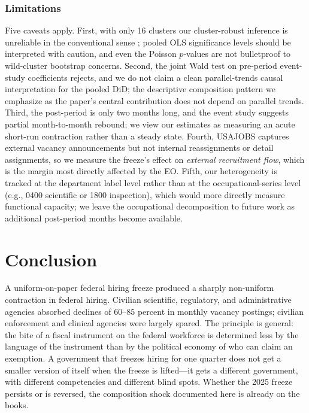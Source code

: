 \documentclass[12pt]{article}
\begin{document}
\subsubsection*{Limitations} Five caveats apply. First, with only 16 clusters our cluster-robust inference is unreliable in the conventional sense \citep{cameron2008bootstrap,mackinnon2017wild}; pooled OLS significance levels should be interpreted with caution, and even the Poisson $p$-values are not bulletproof to wild-cluster bootstrap concerns. Second, the joint Wald test on pre-period event-study coefficients rejects, and we do not claim a clean parallel-trends causal interpretation for the pooled DiD; the descriptive composition pattern we emphasize as the paper's central contribution does not depend on parallel trends. Third, the post-period is only two months long, and the event study suggests partial month-to-month rebound; we view our estimates as measuring an acute short-run contraction rather than a steady state. Fourth, USAJOBS captures external vacancy announcements but not internal reassignments or detail assignments, so we measure the freeze's effect on \emph{external recruitment flow}, which is the margin most directly affected by the EO. Fifth, our heterogeneity is tracked at the department label level rather than at the occupational-series level (e.g., 0400 scientific or 1800 inspection), which would more directly measure functional capacity; we leave the occupational decomposition to future work as additional post-period months become available.

\section{Conclusion}
\label{sec:conc}

A uniform-on-paper federal hiring freeze produced a sharply non-uniform contraction in federal hiring. Civilian scientific, regulatory, and administrative agencies absorbed declines of $60$--$85$ percent in monthly vacancy postings; civilian enforcement and clinical agencies were largely spared. The principle is general: the bite of a fiscal instrument on the federal workforce is determined less by the language of the instrument than by the political economy of who can claim an exemption. A government that freezes hiring for one quarter does not get a smaller version of itself when the freeze is lifted---it gets a different government, with different competencies and different blind spots. Whether the 2025 freeze persists or is reversed, the composition shock documented here is already on the books.
\end{document}
